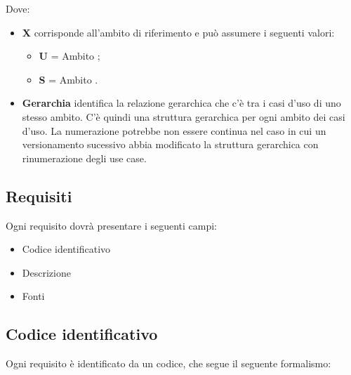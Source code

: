 Dove:
\begin{itemize}
 \item \textbf{X} corrisponde all'ambito di riferimento e può assumere i seguenti valori:
	\begin{itemize}
	 \item[] \textbf{U} = Ambito ;
	 \item[] \textbf{S} = Ambito .
	\end{itemize}

	 \item \textbf{Gerarchia} identifica la relazione gerarchica che c'è tra i casi d'uso di uno stesso ambito. C'è quindi una struttura gerarchica per ogni ambito dei casi d'uso. La numerazione potrebbe non essere continua nel caso in cui un versionamento sucessivo abbia modificato la struttura gerarchica con rinumerazione degli use case.
\end{itemize}

\subsection{Requisiti}

Ogni requisito dovrà presentare i seguenti campi:
\begin{itemize}
 \item Codice identificativo
 \item Descrizione
 \item Fonti
\end{itemize}

\subsection{Codice identificativo}

Ogni requisito è identificato da un codice, che segue il seguente formalismo:
\begin{center}
\end{center}

